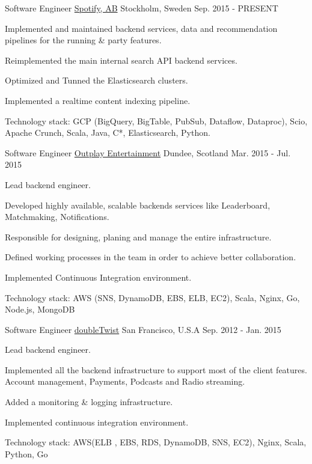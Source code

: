 \begin{cventries}
	\cventry
	{Software Engineer} %
	{\href{https://spotify.com}{Spotify, AB}} %
	{Stockholm, Sweden} %
	{Sep. 2015 - PRESENT} %
	{
		\begin{cvitems} %
			\item {Implemented and maintained backend services, data and recommendation pipelines for the running \& party features.}
			\item {Reimplemented the main internal search API backend services.}
			\item {Optimized and Tunned the Elasticsearch clusters.}
			\item {Implemented a realtime content indexing pipeline.}
			\item {Technology stack: GCP (BigQuery, BigTable, PubSub, Dataflow, Dataproc), Scio, Apache Crunch, Scala, Java, C*, Elasticsearch, Python.}
		\end{cvitems}
	}

	\cventry
	{Software Engineer} %
	{\href{https://outplay.com}{Outplay Entertainment}} %
	{Dundee, Scotland} %
	{Mar. 2015 - Jul. 2015} %
	{
		\begin{cvitems} %
			\item {Lead backend engineer.}
			\item {Developed highly available, scalable backends services like Leaderboard, Matchmaking, Notifications.}
			\item {Responsible for designing, planing and manage the entire infrastructure.}
			\item {Defined working processes in the team in order to achieve better collaboration.}
			\item {Implemented Continuous Integration environment.}
			\item {Technology stack: AWS (SNS, DynamoDB, EBS, ELB, EC2), Scala, Nginx, Go, Node.js, MongoDB}
		\end{cvitems}
	}

	\cventry
	{Software Engineer} %
	{\href{https://www.doubletwist.com}{doubleTwist}} %
	{San Francisco, U.S.A} %
	{Sep. 2012 - Jan. 2015} %
	{
		\begin{cvitems} %
			\item {Lead backend engineer.}
			\item {Implemented all the backend infrastructure to support most of the client features. Account management, Payments, Podcasts and Radio streaming.}
			\item {Added a monitoring \& logging infrastructure.}
			\item {Implemented continuous integration environment.}
			\item {Technology stack: AWS(ELB , EBS, RDS, DynamoDB, SNS, EC2), Nginx, Scala, Python, Go}
		\end{cvitems}
	}


\end{cventries}
